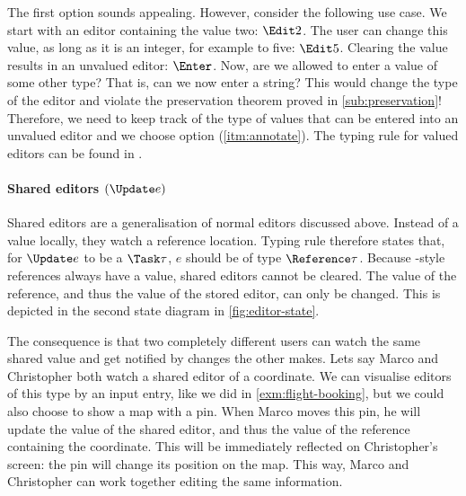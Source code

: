 The first option sounds appealing.
However, consider the following use case.
We start with an editor containing the value two: $\Edit 2$.
The user can change this value, as long as it is an integer,
for example to five: $\Edit 5$.
Clearing the value results in an unvalued editor: $\Enter$.
Now, are we allowed to enter a value of some other type?
That is, can we now enter a string?
This would change the type of the editor
and violate the preservation theorem proved in \autoref{sub:preservation}!
Therefore,
we need to keep track of the type of values that can be entered into an unvalued editor
and we choose option (\ref{itm:annotate}).
The typing rule for valued editors can be found in .



\paragraph{Shared editors $(\Update e)$}

Shared editors are a generalisation of normal editors discussed above.
Instead of  a value locally,
they watch a reference location.
Typing rule  therefore states that,
for $\Update e$ to be a $\Task \tau$,
$e$ should be of type $\Reference \tau$.
Because \ML-style references always have a value,
shared editors cannot be cleared.
The value of the reference,
and thus the value of the stored editor,
can only be changed.
This is depicted in the second state diagram in \autoref{fig:editor-state}.

The consequence is that two completely different users can watch the same shared value
and get notified by changes the other makes.
Lets say Marco and Christopher both watch a shared editor of a coordinate.
We can visualise editors of this type by an input entry,
like we did in \autoref{exm:flight-booking},
but we could also choose to show a map with a pin.
When Marco moves this pin,
he will update the value of the shared editor,
and thus the value of the reference containing the coordinate.
This will be immediately reflected on Christopher's screen:
the pin will change its position on the map.
This way, Marco and Christopher can work together editing the same information.

